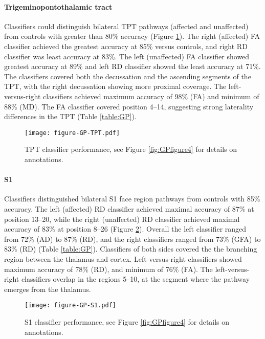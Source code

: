\paragraph{Trigeminopontothalamic tract}
Classifiers could distinguish bilateral TPT pathways (affected and unaffected) from controls with greater than 80\% accuracy (Figure \ref{fig:GPfigureTPT}). The right (affected) FA classifier achieved the greatest accuracy at 85\% versus controls, and right RD classifier was least accuracy at 83\%. The left (unaffected) FA classifier showed greatest accuracy at 89\% and left RD classifier showed the least accuracy at 71\%. The classifiers covered both the decussation and the ascending segments of the TPT, with the right decussation showing more proximal coverage. The left-versus-right classifiers achieved maximum accuracy of 98\% (FA) and minimum of 88\% (MD). The FA classifier covered position 4--14, suggesting strong laterality differences in the TPT (Table \ref{table:GP}). 

\begin{figure}[ht]
\centering
\texttt{[image: figure-GP-TPT.pdf]}
\caption{TPT classifier performance, see Figure \ref{fig:GPfigure4} for details on annotations.}
\label{fig:GPfigureTPT}
\end{figure}

\paragraph{S1}
Classifiers distinguished bilateral S1 face region pathways from controls with 85\% accuracy. The left (affected) RD classifier achieved maximal accuracy of 87\% at position 13--20, while the right (unaffected) RD classifier achieved maximal accuracy of 83\% at position 8--26 (Figure \ref{fig:GPfigure5}). Overall the left classifier ranged from 72\% (AD) to 87\% (RD), and the right classifiers ranged from 73\% (GFA) to 83\% (RD) (Table \ref{table:GP}). Classifiers of both sides covered the the branching region between the thalamus and cortex. Left-versus-right classifiers showed maximum accuracy of 78\% (RD), and minimum of 76\% (FA). The left-versus-right classifiers overlap in the regions 5--10, at the segment where the pathway emerges from the thalamus.

\begin{figure}[ht]
\centering
\texttt{[image: figure-GP-S1.pdf]}
\caption{S1 classifier performance, see Figure \ref{fig:GPfigure4} for details on annotations.}
\label{fig:GPfigure5}
\end{figure}

